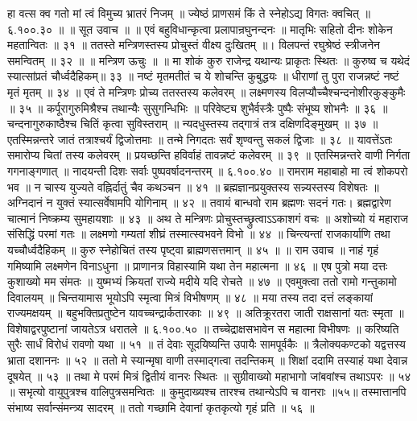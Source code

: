 हा वत्स क्व गतो मां त्वं विमुच्य भ्रातरं निजम् ॥
ज्येष्ठं प्राणसमं किं ते स्नेहोऽद्य विगतः क्वचित् ॥ ६.१००.३० ॥
॥ सूत उवाच ॥ ॥
एवं बहुविधान्कृत्वा प्रलापान्रघुनन्दनः ॥
मातृभिः सहितो दीनः शोकेन महतान्वितः ॥ ३१ ॥
ततस्ते मन्त्रिणस्तस्य प्रोचुस्तं वीक्ष्य दुःखितम् ॥।
विलपन्तं रघुश्रेष्ठं स्त्रीजनेन समन्वितम् ॥ ३२ ॥
॥ मन्त्रिण ऊचुः ॥ ॥
मा शोकं कुरु राजेन्द्र यथान्यः प्राकृतः स्थितः ॥
कुरुष्व च यथेदं स्यात्सांप्रतं चौर्ध्वदैहिकम्॥ ३३ ॥
नष्टं मृतमतीतं च ये शोचन्ति कुबुद्धयः ॥
धीराणां तु पुरा राजन्नष्टं नष्टं मृतं मृतम् ॥ ३४ ॥
एवं ते मन्त्रिणः प्रोच्य ततस्तस्य कलेवरम् ॥
लक्ष्मणस्य विलप्यौच्चैश्चन्दनोशीरकुङ्कुमैः ॥ ३५ ॥
कर्पूरागुरुमिश्रैश्च तथान्यैः सुसुगन्धिभिः ॥
परिवेष्ट्य शुभैर्वस्त्रैः पुष्पैः संभूष्य शोभनैः ॥ ३६ ॥
चन्दनागुरुकाष्ठैश्च चितिं कृत्वा सुविस्तराम् ॥
न्यदधुस्तस्य तद्गात्रं तत्र दक्षिणदिङ्मुखम् ॥ ३७ ॥
एतस्मिन्नन्तरे जातं तत्राश्चर्यं द्विजोत्तमाः ॥
तन्मे निगदतः सर्वं शृण्वन्तु सकलं द्विजाः ॥ ३८ ॥
यावत्तेंऽतः समारोप्य चितां तस्य कलेवरम् ॥
प्रयच्छन्ति हविर्वाहं तावन्नष्टं कलेवरम् ॥ ३९ ॥
एतस्मिन्नन्तरे वाणी निर्गता गगनाङ्गणात् ॥
नादयन्ती दिशः सर्वाः पुष्पवर्षादनन्तरम् ॥ ६.१००.४० ॥
रामराम महाबाहो मा त्वं शोकपरो भव ॥
न चास्य युज्यते वह्निर्दातुं चैव कथञ्चन ॥ ४१ ॥
ब्रह्मज्ञानप्रयुक्तस्य सन्न्यस्तस्य विशेषतः ॥
अग्निदानं न युक्तं स्यात्सर्वेषामपि योगिनाम् ॥ ४२ ॥
तवायं बान्धवो राम ब्रह्मणः सदनं गतः।
ब्रह्मद्वारेण चात्मानं निष्क्रम्य सुमहायशाः ॥ ४३ ॥
अथ ते मन्त्रिणः प्रोचुस्तच्छ्रुत्वाऽऽकाशगं वचः ॥
अशोच्यो यं महाराज संसिद्धिं परमां गतः ॥
लक्ष्मणो गम्यतां शीघ्रं तस्मात्स्वभवने विभो ॥ ४४ ॥
चिन्त्यन्तां राजकार्याणि तथा यच्चौर्ध्वदैहिकम् ॥
कुरु स्नेहोचितं तस्य पृष्ट्वा ब्राह्मणसत्तमान् ॥ ४५ ॥
॥ राम उवाच ॥
नाहं गृहं गमिष्यामि लक्ष्मणेन विनाऽधुना ॥
प्राणानत्र विहास्यामि यथा तेन महात्मना ॥ ४६ ॥
एष पुत्रो मया दत्तः कुशाख्यो मम संमतः ॥
युष्मभ्यं क्रियतां राज्ये मदीये यदि रोचते ॥ ४७ ॥
एवमुक्त्वा ततो रामो गन्तुकामो दिवालयम् ॥
चिन्तयामास भूयोऽपि स्मृत्वा मित्रं विभीषणम् ॥ ४८ ॥
मया तस्य तदा दत्तं लङ्कायां राज्यमक्षयम् ॥
बहुभक्तिप्रतुष्टेन यावच्चन्द्रार्कतारकाः ॥ ४९ ॥
अतिक्रूरतरा जाती राक्षसानां यतः स्मृता ॥
विशेषाद्वरपुष्टानां जायतेऽत्र धरातले ॥ ६.१००.५० ॥
तच्चेद्राक्षसभावेन स महात्मा विभीषणः ॥
करिष्यति सुरैः सार्धं विरोधं रावणो यथा ॥ ५१ ॥
तं देवाः सूदयिष्यन्ति उपायैः सामपूर्वकैः ॥
त्रैलोक्यकण्टको यद्वत्तस्य भ्राता दशाननः ॥ ५२ ॥
ततो मे स्यान्मृषा वाणी तस्माद्गत्वा तदन्तिकम् ॥
शिक्षां ददामि तस्याहं यथा देवान्न दूषयेत् ॥ ५३ ॥
तथा मे परमं मित्रं द्वितीयं वानरः स्थितः ॥
सुग्रीवाख्यो महाभागो जांबवांश्च तथाऽपरः ॥ ५४ ॥
सभृत्यो वायुपुत्रश्च वालिपुत्रसमन्वितः ॥
कुमुदाख्यश्च तारश्च तथान्येऽपि च वानराः ॥५५॥
तस्मात्तानपि संभाष्य सर्वान्संमन्त्र्य सादरम् ॥
ततो गच्छामि देवानां कृतकृत्यो गृहं प्रति ॥ ५६ ॥
